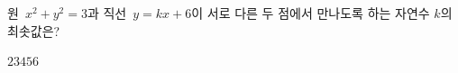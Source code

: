 원~$x^2+y^2=3$과 직선~$y=kx+6$이 서로 다른 두 점에서 만나도록 하는 자연수 $k$의 최솟값은?
\begin{choices32}{$2$}{$3$}{$4$}{$5$}{$6$}\end{choices32}
